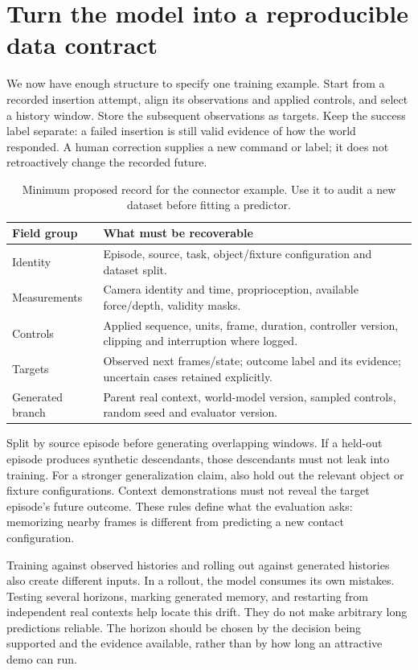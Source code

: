 \section{Turn the model into a reproducible data contract}
We now have enough structure to specify one training example. Start from a recorded insertion attempt, align its observations and applied controls, and select a history window. Store the subsequent observations as targets. Keep the success label separate: a failed insertion is still valid evidence of how the world responded. A human correction supplies a new command or label; it does not retroactively change the recorded future.

\begin{table}[H]\centering\small
\caption{Minimum proposed record for the connector example. Use it to audit a new dataset before fitting a predictor.}
\begin{tabularx}{\linewidth}{@{}p{30mm}Y@{}}\toprule
Field group & What must be recoverable\\\midrule
Identity & Episode, source, task, object/fixture configuration and dataset split.\\
Measurements & Camera identity and time, proprioception, available force/depth, validity masks.\\
Controls & Applied sequence, units, frame, duration, controller version, clipping and interruption where logged.\\
Targets & Observed next frames/state; outcome label and its evidence; uncertain cases retained explicitly.\\
Generated branch & Parent real context, world-model version, sampled controls, random seed and evaluator version.\\\bottomrule
\end{tabularx}
\end{table}

Split by source episode before generating overlapping windows. If a held-out episode produces synthetic descendants, those descendants must not leak into training. For a stronger generalization claim, also hold out the relevant object or fixture configurations. Context demonstrations must not reveal the target episode's future outcome. These rules define what the evaluation asks: memorizing nearby frames is different from predicting a new contact configuration.

Training against observed histories and rolling out against generated histories also create different inputs. In a rollout, the model consumes its own mistakes. Testing several horizons, marking generated memory, and restarting from independent real contexts help locate this drift. They do not make arbitrary long predictions reliable. The horizon should be chosen by the decision being supported and the evidence available, rather than by how long an attractive demo can run.

